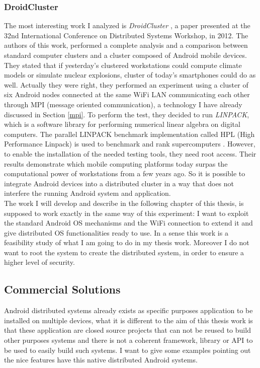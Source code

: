 \subsubsection{DroidCluster}
The most interesting work I analyzed is \textit{DroidCluster} \cite{6258144}, a paper presented at the 32nd International Conference on Distributed Systems Workshop, in 2012. The authors of this work, performed a complete analysis and a comparison between standard computer clusters and a cluster composed of Android mobile devices. They stated that if yesterday's clustered workstations could compute climate models or simulate nuclear explosions, cluster of today's smartphones could do as well. Actually they were right, they performed an experiment using a cluster of six Android nodes connected at the same WiFi LAN communicating each other through MPI (message oriented communication), a technology I have already discussed in Section \ref{mpi}. To perform the test, they decided to run \textit{LINPACK}, which is a software library for performing numerical linear algebra on digital computers. The parallel LINPACK benchmark implementation called HPL (High Performance Linpack) is used to benchmark and rank supercomputers  \cite{jan2005sidebar}. However, to enable the installation of the needed testing tools, they need root access. Their results demonstrate which mobile computing platforms today surpas the computational power of workstations from a few years ago. So it is possible to integrate Android devices into a distributed cluster in a way that does not interfere the running Android system and application.\\
The work I will develop and describe in the following chapter of this thesis, is supposed to work exactly in the same way of this experiment: I want to exploit the standard Android OS mechanisms and the WiFi connection to extend it and give distributed OS functionalities ready to use. In a sense this work is a feasibility study of what I am going to do in my thesis work. Moreover I do not want to root the system to create the distributed system, in order to ensure a higher level of security.
\subsection{Commercial Solutions}
Android distributed systems already exists as specific purposes application to be installed on multiple devices, what it is different to the aim of this thesis work is that these application are closed source projects that can not be reused to build other purposes systems and there is not a coherent framework, library or API to be used to easily build such systems.
I want to give some examples pointing out the nice features have this native distributed Android systems.
